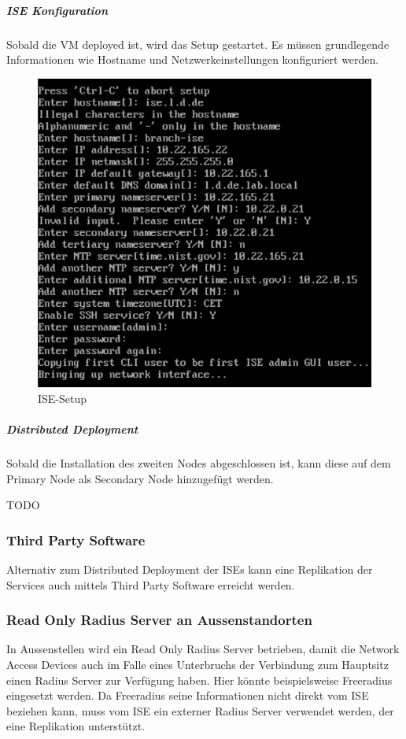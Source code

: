 \subparagraph{ISE Konfiguration}

Sobald die VM deployed ist, wird das Setup gestartet. Es müssen grundlegende Informationen wie Hostname und Netzwerkeinstellungen konfiguriert werden.  

\begin{figure}[H]
	\centering
	\includegraphics[width=0.8\linewidth]{img/Absicherung/ISE-Setup.png}
	\caption{ISE-Setup}
	\label{fig:ISE-Setup}
\end{figure}

\subparagraph{Distributed Deployment}

Sobald die Installation des zweiten Nodes abgeschlossen ist, kann diese auf dem Primary Node als Secondary Node hinzugefügt werden.

TODO

\subsubsection{Third Party Software}

Alternativ zum Distributed Deployment der ISEs kann eine Replikation der Services auch mittels Third Party Software erreicht werden. 

\subsubsection{Read Only Radius Server an Aussenstandorten}

In Aussenstellen wird ein Read Only Radius Server betrieben, damit die Network Access Devices auch im Falle eines Unterbruchs der Verbindung zum Hauptsitz einen Radius Server zur Verfügung haben. Hier könnte beispielsweise Freeradius eingesetzt werden. Da Freeradius seine Informationen nicht direkt vom ISE beziehen kann, muss vom ISE ein externer Radius Server verwendet werden, der eine Replikation unterstützt. 


